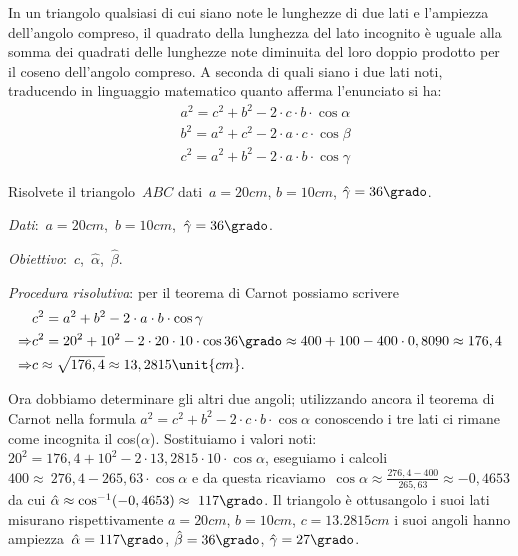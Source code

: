 \begin{teorema}
In un triangolo qualsiasi di cui siano note le lunghezze di due lati e 
l'ampiezza dell'angolo compreso, il quadrato della lunghezza
del lato incognito è uguale alla somma dei quadrati delle lunghezze note 
diminuita del loro doppio prodotto per il coseno dell'angolo compreso.
A seconda di quali siano i due lati noti, traducendo in linguaggio matematico 
quanto afferma l'enunciato si ha:
\begin{align*}
&a^{2}=c^{2}+b^{2}-2\cdot c\cdot b\cdot \cos \alpha\\
&b^{2}=a^{2}+c^{2}-2\cdot a\cdot c\cdot \cos  \beta\\
&c^{2}=a^{2}+b^{2}-2\cdot a\cdot b\cdot \cos \gamma
\end{align*}
\end{teorema}

\begin{problema}
Risolvete il triangolo~\(ABC\) dati~\(a= 20\unit{cm}\), \(b=10\unit{cm}\), 
\({\hat{\gamma}}=36\grado\).
\end{problema}

\emph{Dati}:~\(a= 
20\unit{cm}\),\quad~\(b=10\unit{cm}\),\quad~\({\hat{\gamma}}=36\grado\).

\emph{Obiettivo}:~\(c\),\quad~\(\hat{\alpha}\),\quad~\(\hat{\beta}\).

\emph{Procedura risolutiva}:
per il teorema di Carnot possiamo scrivere
\begin{align*}
&c^{2}=a^{2}+b^{2}-2\cdot a\cdot b\cdot \cos  \gamma\\
\Rightarrow &c^{2}=20^{2}+10^{2}-2\cdot 20\cdot 10\cdot 
\cos 36\grado \approx400+100-400\cdot 0,8090\approx176,4\\
\Rightarrow &c\approx\sqrt{176,4}\approx13,2815\unit{cm}.
\end{align*}

Ora dobbiamo determinare gli altri due angoli; utilizzando ancora il teorema 
di 
Carnot nella formula
\(a^{2}=c^{2}+b^{2}-2\cdot c\cdot b\cdot \cos  \alpha\) 
conoscendo i tre lati ci rimane come incognita il cos(\({\alpha}\)). 
Sostituiamo i valori noti:~\(20^{2}=176,4+10^{2}-2\cdot 
13,2815\cdot 10\cdot \cos  \alpha\), eseguiamo i calcoli
\(400\approx~276,4-265,63\cdot \cos  \alpha\) e da questa ricaviamo~\(\cos  
\alpha\approx \frac{276,4-400}{265,63}\approx-0,4653\) da cui
\(\hat{\alpha}\approx\cos ^{-1}(-0,4653)\approx~117\grado\). Il triangolo è 
ottusangolo i suoi lati misurano rispettivamente
\(a=20\unit{cm}\), \(b=10\unit{cm}\), \(c=13.2815\unit{cm}\) i suoi angoli hanno 
ampiezza~\(\hat{\alpha} =117\grado\), \(\hat{\beta} =36\grado\), \(\hat{\gamma} 
=27\grado\).

